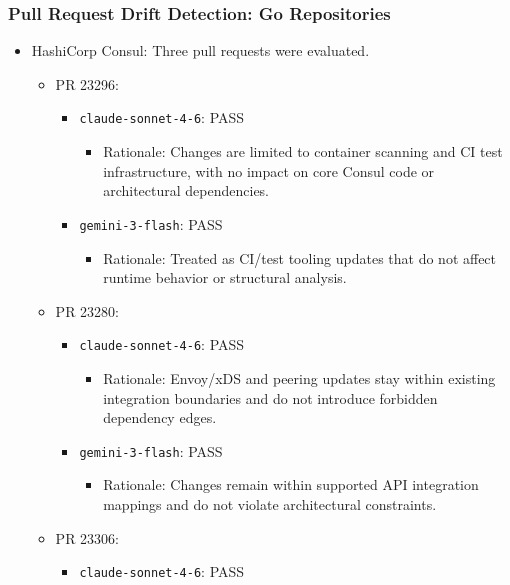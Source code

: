 \documentclass[sigconf,screen]{acmart}
\begin{document}
\subsubsection{Pull Request Drift Detection: Go Repositories}
\begin{itemize}
    \item HashiCorp Consul: Three pull requests were evaluated.
    \begin{itemize}
        \item PR 23296:
        \begin{itemize}
            \item \texttt{claude-sonnet-4-6}: PASS
            \begin{itemize}
                \item Rationale: Changes are limited to container scanning and CI test infrastructure, with no impact on core Consul code or architectural dependencies.
            \end{itemize}
            \item \texttt{gemini-3-flash}: PASS
            \begin{itemize}
                \item Rationale: Treated as CI/test tooling updates that do not affect runtime behavior or structural analysis.
            \end{itemize}
        \end{itemize}
        \item PR 23280:
        \begin{itemize}
            \item \texttt{claude-sonnet-4-6}: PASS
            \begin{itemize}
                \item Rationale: Envoy/xDS and peering updates stay within existing integration boundaries and do not introduce forbidden dependency edges.
            \end{itemize}
            \item \texttt{gemini-3-flash}: PASS
            \begin{itemize}
                \item Rationale: Changes remain within supported API integration mappings and do not violate architectural constraints.
            \end{itemize}
        \end{itemize}
        \item PR 23306:
        \begin{itemize}
            \item \texttt{claude-sonnet-4-6}: PASS

\end{itemize}
\end{itemize}
\end{itemize}
\end{document}
